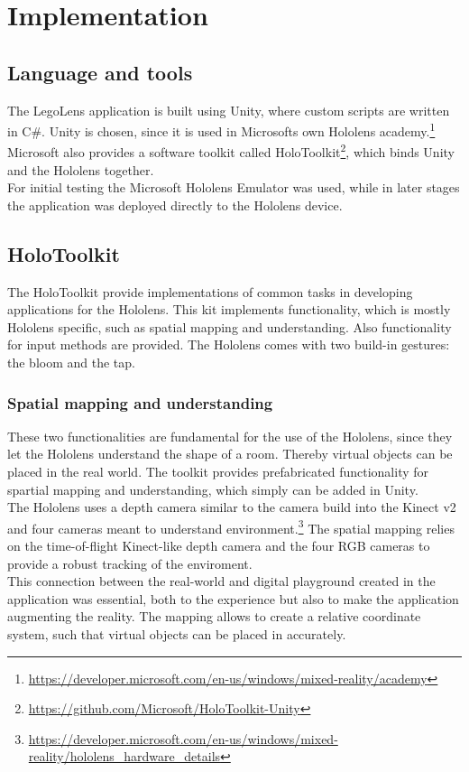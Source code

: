 \section{Implementation}

\subsection{Language and tools}
The LegoLens application is built using Unity, where custom scripts are written in C\#. Unity is chosen, since it is used in Microsofts own Hololens academy.\footnote{\url{https://developer.microsoft.com/en-us/windows/mixed-reality/academy}} Microsoft also provides a software toolkit called HoloToolkit\footnote{\url{https://github.com/Microsoft/HoloToolkit-Unity}}, which binds Unity and the Hololens together. \\
For initial testing the Microsoft Hololens Emulator was used, while in later stages the application was deployed directly to the Hololens device. 

\subsection{HoloToolkit}
The HoloToolkit provide implementations of common tasks in developing applications for the Hololens. This kit implements functionality, which is mostly Hololens specific, such as spatial mapping and understanding. Also functionality for input methods are provided. The Hololens comes with two build-in gestures: the bloom and the tap.

\subsubsection{Spatial mapping and understanding}
These two functionalities are fundamental for the use of the Hololens, since they let the Hololens understand the shape of a room. Thereby virtual objects can be placed in the real world. The toolkit provides prefabricated functionality for spartial mapping and understanding, which simply can be added in Unity.  \\
The Hololens uses a depth camera similar to the camera build into the Kinect v2 and four cameras meant to understand environment.\footnote{\url{https://developer.microsoft.com/en-us/windows/mixed-reality/hololens_hardware_details}} The spatial mapping relies on the time-of-flight Kinect-like depth camera and the four RGB cameras to provide a robust tracking of the enviroment. \\
This connection between the real-world and digital playground created in the application was essential, both to the experience but also to make the application augmenting the reality. The mapping allows to create a relative coordinate system, such that virtual objects can be placed in accurately.

